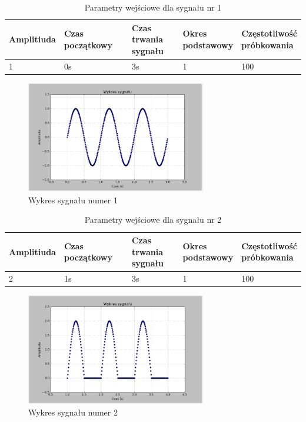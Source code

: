 \documentclass{article}
\begin{document}
{{    \begin{table}[h!]
    \centering
    \begin{tabular}{|l|l|l|l|l|}
        \hline
        Amplitiuda & Czas początkowy & \shortstack{Czas trwania \\ sygnału} & \shortstack{Okres \\ podstawowy} & \shortstack{Częstotliwość\\ próbkowania}   \\ \hline
        1 & 0s & 3s & 1 & 100           \\ \hline
    \end{tabular}
    \caption{Parametry wejściowe dla sygnału nr 1}
    \end{table}
    \begin{figure}[h!]
    \centering
    \includegraphics[width=0.7\textwidth]{img/splot1.png}
    \caption{Wykres sygnału numer 1}
    \end{figure}
    \FloatBarrier
    \begin{table}[h!]
    \centering
    \begin{tabular}{|l|l|l|l|l|}
        \hline
        Amplitiuda & Czas początkowy & \shortstack{Czas trwania \\ sygnału} & \shortstack{Okres \\ podstawowy} & \shortstack{Częstotliwość\\ próbkowania}   \\ \hline
        2 & 1s & 3s & 1 & 100           \\ \hline
    \end{tabular}
    \caption{Parametry wejściowe dla sygnału nr 2}
    \end{table}
    \begin{figure}[h!]
    \centering
    \includegraphics[width=0.7\textwidth]{img/splot4.png}
    \caption{Wykres sygnału numer 2}
    \end{figure}

}}
\end{document}
